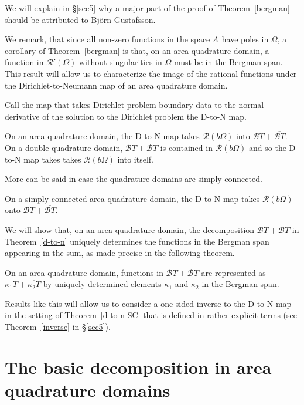 \documentclass[12pt]{amsart}
\newcommand\Om{\Omega}
\numberwithin{equation}{section}
\begin{document}
We will explain in \S\ref{sec5} why a major part
of the proof of Theorem~\ref{bergman} should be
attributed to Bj\"orn Gustafsson.

We remark, that since all non-zero functions in the
space $\mathnormal{\Lambda}$ have poles in $\Om$, a corollary
of Theorem~\ref{bergman} is that, on an area quadrature
domain, a function in ${\mathcal R}'(\Om)$ without
singularities in $\Om$ must be in the Bergman span.
This result will allow us to characterize the image
of the rational functions under the Dirichlet-to-Neumann
map of an area quadrature domain.

Call the map that takes Dirichlet problem boundary
data to the normal derivative of the solution to the
Dirichlet problem the D-to-N map. 

\begin{thm}
\label{d-to-n}
On an area quadrature domain, the D-to-N map takes
${\mathcal R}(b\Om)$ into
$\mathcal B T+ \overline{\mathcal B T}$.
On a double quadrature domain,
$\mathcal B T+ \overline{\mathcal B T}$ is contained
in ${\mathcal R}(b\Om)$ and so the D-to-N map takes
takes ${\mathcal R}(b\Om)$ into itself.
\end{thm}

More can be said in case the quadrature domains are
simply connected.

\begin{thm}
\label{d-to-n-SC}
On a simply connected area quadrature domain, the D-to-N map takes
${\mathcal R}(b\Om)$ onto
$\mathcal B T+ \overline{\mathcal B T}$.
\end{thm}

We will show that, on an area quadrature domain, the
decomposition $\mathcal B T+ \overline{\mathcal B T}$
in Theorem~\ref{d-to-n} uniquely
determines the functions in the Bergman span appearing
in the sum, as made precise in the following
theorem.

\begin{thm}
\label{uniqueness}
On an area quadrature domain, functions in
$\mathcal B T+ \overline{\mathcal B T}$
are represented as
$\kappa_1 T+\overline{\kappa_2 T}$
by uniquely determined elements $\kappa_1$ and
$\kappa_2$ in the Bergman span.
\end{thm}

Results like this will allow us to consider a one-sided inverse
to the D-to-N map in the setting of Theorem~\ref{d-to-n-SC} that
is defined in rather explicit terms (see
Theorem~\ref{inverse} in \S\ref{sec5}).

\section{The basic decomposition in area quadrature domains}
\label{sec2}
\end{document}
